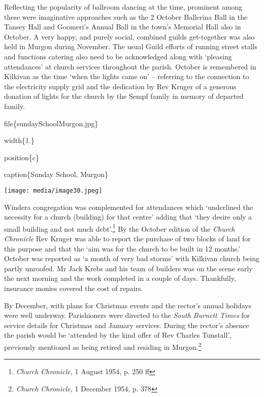 Reflecting the popularity of ballroom dancing at the time, prominent among these were imaginative approaches such as the 2 October Ballerina Ball in the Tansey Hall and Goomeri's Annual Ball in the town's Memorial Hall also in October. A very happy, and purely social, combined guilds get-together was also held in Murgon during November. The usual Guild efforts of running street stalls and functions catering also need to be acknowledged along with `pleasing attendances' at church services throughout the parish. October is remembered in Kilkivan as the time `when the lights came on' -- referring to the connection to the electricity supply grid and the dedication by Rev Kruger of a generous donation of lights for the church by the Sempf family in memory of departed family.

file\{sundaySchoolMurgon.jpg\}

width\{1.\}

position\{c\}

caption\{Sunday School, Murgon\}

\texttt{[image: media/image30.jpeg]}

Windera congregation was complemented for attendances which `underlined the necessity for a church (building) for that centre' adding that `they desire only a small building and not much debt'.\footnote{\emph{Church Chronicle,} 1 August 1954, p. 250 ff} By the October edition of the \emph{Church Chronicle} Rev Kruger was able to report the purchase of two blocks of land for this purpose and that the `aim was for the church to be built in 12 months.' October was reported as `a month of very bad storms' with Kilkivan church being partly unroofed. Mr Jack Krebs and his team of builders was on the scene early the next morning and the work completed in a couple of days. Thankfully, insurance monies covered the cost of repairs.

By December, with plans for Christmas events and the rector's annual holidays were well underway. Parishioners were directed to the \emph{South Burnett Times} for service details for Christmas and January services. During the rector's absence the parish would be `attended by the kind offer of Rev Charles Tunstall', previously mentioned as being retired and residing in Murgon.\footnote{\emph{Church Chronicle,} 1 December 1954, p. 378}

